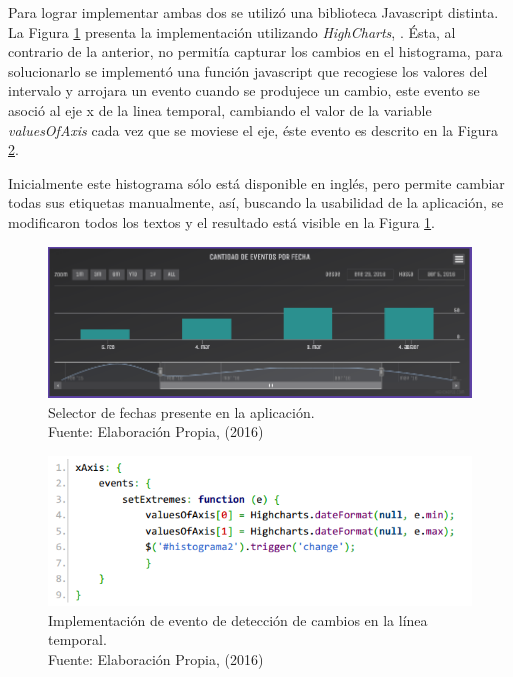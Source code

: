 Para lograr implementar ambas dos se utilizó una biblioteca Javascript distinta. La Figura \ref{fig:HistogramaFinal} presenta la implementación utilizando \textit{HighCharts}, \cite{Highcharts}. Ésta, al contrario de la anterior, no permitía capturar los cambios en el histograma, para solucionarlo se implementó una función javascript que recogiese los valores del intervalo y arrojara un evento cuando se produjece un cambio, este evento se asoció al eje x de la linea temporal, cambiando el valor de la variable \textit{valuesOfAxis} cada vez que se moviese el eje, éste evento es descrito en la Figura \ref{fig:implementacionCambiosEnEje}.

Inicialmente este histograma sólo está disponible en inglés, pero permite cambiar todas sus etiquetas manualmente, así, buscando la usabilidad de la aplicación, se modificaron todos los textos y el resultado está visible en la Figura \ref{fig:HistogramaFinal}.

\begin{figure}[H]
	\centering
	\captionsetup{justification=centering}
	\includegraphics[scale=0.6]{images/Histograma.png}
	\caption[Selector de fechas presente en la aplicación.]{Selector de fechas presente en la aplicación.\\Fuente: Elaboración Propia, (2016)}
	\label{fig:HistogramaFinal}
\end{figure}

\begin{figure}[H]
	\centering
	\captionsetup{justification=centering}
	\includegraphics[scale=0.8]{images/onChangeEventTimeline.png}
	\caption[Implementación de evento de detección de cambios en la línea temporal.]{Implementación de evento de detección de cambios en la línea temporal.\\Fuente: Elaboración Propia, (2016)}
	\label{fig:implementacionCambiosEnEje}
\end{figure}

